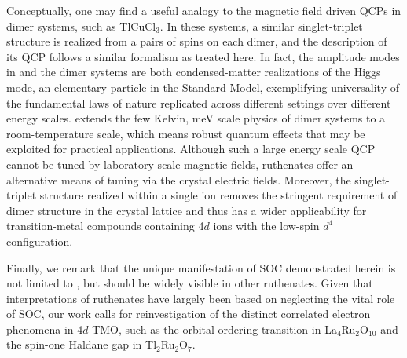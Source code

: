 Conceptually, one may find a useful analogy to the magnetic field driven QCPs in dimer systems, such as TlCuCl$_3$. In these systems, a similar singlet-triplet structure is realized from a pairs of spins on each dimer, and the description of its QCP follows a similar formalism as treated here. In fact, the amplitude modes in \CRO and the dimer systems are both condensed-matter realizations of the Higgs mode, an elementary particle in the Standard Model, exemplifying universality of the fundamental laws of nature replicated across different settings over different energy scales. \CRO extends the few Kelvin, meV scale physics of dimer systems to a room-temperature scale, which means robust quantum effects that may be exploited for practical applications. Although such a large energy scale QCP cannot be tuned by laboratory-scale magnetic fields, ruthenates offer an alternative means of tuning via the crystal electric fields. Moreover, the singlet-triplet structure realized within a single ion removes the stringent requirement of dimer structure in the crystal lattice and thus has a wider applicability for transition-metal compounds containing 4$d$ ions with the low-spin $d^4$ configuration.
  
Finally, we remark that the unique manifestation of SOC demonstrated herein is not limited to \CROns, but should be widely visible in other ruthenates. Given that interpretations of ruthenates have largely been based on neglecting the vital role of SOC, our work calls for reinvestigation of the distinct correlated electron phenomena in 4$d$ TMO, such as the orbital ordering transition in La$_4$Ru$_2$O$_{10}$ and the spin-one Haldane gap in Tl$_2$Ru$_2$O$_7$.
  
  